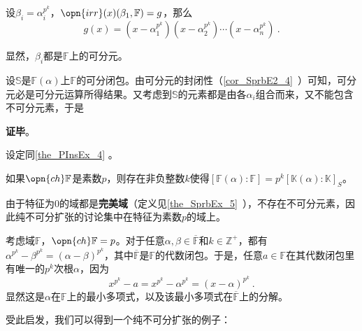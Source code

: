 设$\beta_i=\alpha_i^{p^k}$，$\opn{irr}(x)(\beta_1, \mathbb{F})=g$，那么
\begin{equation}
g(x) = (x-\alpha^{p^k}_1)(x-\alpha^{p^k}_2)\cdots(x-\alpha^{p^k}_n)~.
\end{equation}

显然，$\beta_i$都是$\mathbb{F}$上的可分元。

设$\mathbb{S}$是$\mathbb{F}(\alpha)$上$\mathbb{F}$的可分闭包。由可分元的封闭性（\autoref{cor_SprbE2_4}~）可知，可分元必是可分元运算所得结果。又考虑到$\mathbb{S}$的元素都是由各$\alpha_i$组合而来，又不能包含不可分元素，于是

\textbf{证毕}。





\begin{corollary}{}
设定同\autoref{the_PInsEx_4} 。

如果$\opn{ch}\mathbb{F}$是素数$p$，则存在非负整数$k$使得$[\mathbb{F}(\alpha):\mathbb{F}]=p^k[\mathbb{K}(\alpha):\mathbb{K}]_S$。
\end{corollary}



由于特征为$0$的域都是\textbf{完美域}（定义见\autoref{the_SprbEx_5}~），不存在不可分元素，因此纯不可分扩张的讨论集中在特征为素数$p$的域上。

考虑域$\mathbb{F}$，$\opn{ch}\mathbb{F}=p$。对于任意$\alpha, \beta\in\overline{\mathbb{F}}$和$k\in\mathbb{Z}^+$，都有$\alpha^{p^k}-\beta^{p^k}=(\alpha-\beta)^{p^k}$，其中$\overline{\mathbb{F}}$是$\mathbb{F}$的代数闭包。于是，任意$a\in\mathbb{F}$在其代数闭包里有唯一的$p^k$次根$\alpha$，因为
\begin{equation}
x^{p^k}-a=x^{p^k}-\alpha^{p^k}=(x-\alpha)^{p^k}~.
\end{equation}
显然这是$\alpha$在$\mathbb{F}$上的最小多项式，以及该最小多项式在$\overline{\mathbb{F}}$上的分解。


受此启发，我们可以得到一个纯不可分扩张的例子：

